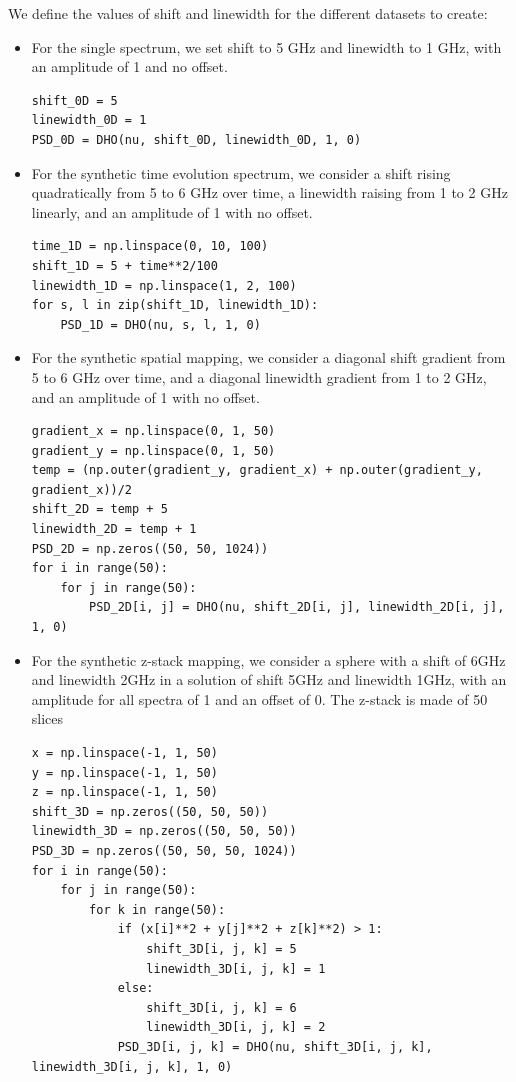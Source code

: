 \documentclass{article}
\begin{document}
We define the values of shift and linewidth for the different datasets to create:
\begin{itemize}
    \item For the single spectrum, we set shift to 5 GHz and linewidth to 1 GHz, with an amplitude of 1 and no offset.
\begin{lstlisting}
shift_0D = 5
linewidth_0D = 1
PSD_0D = DHO(nu, shift_0D, linewidth_0D, 1, 0)
\end{lstlisting}
    \item For the synthetic time evolution spectrum, we consider a shift rising quadratically from 5 to 6 GHz over time, a linewidth raising from 1 to 2 GHz linearly, and an amplitude of 1 with no offset.
\begin{lstlisting}
time_1D = np.linspace(0, 10, 100)
shift_1D = 5 + time**2/100
linewidth_1D = np.linspace(1, 2, 100)
for s, l in zip(shift_1D, linewidth_1D):
    PSD_1D = DHO(nu, s, l, 1, 0)
\end{lstlisting}
    \item For the synthetic spatial mapping, we consider a diagonal shift gradient from 5 to 6 GHz over time, and a diagonal linewidth gradient from 1 to 2 GHz, and an amplitude of 1 with no offset.
\begin{lstlisting}
gradient_x = np.linspace(0, 1, 50)
gradient_y = np.linspace(0, 1, 50)
temp = (np.outer(gradient_y, gradient_x) + np.outer(gradient_y, gradient_x))/2
shift_2D = temp + 5
linewidth_2D = temp + 1 
PSD_2D = np.zeros((50, 50, 1024))
for i in range(50):
    for j in range(50):
        PSD_2D[i, j] = DHO(nu, shift_2D[i, j], linewidth_2D[i, j], 1, 0) 
\end{lstlisting}
    \item For the synthetic z-stack mapping, we consider a sphere with a shift of 6GHz and linewidth 2GHz in a solution of shift 5GHz and linewidth 1GHz, with an amplitude for all spectra of 1 and an offset of 0. The z-stack is made of 50 slices 
\begin{lstlisting}
x = np.linspace(-1, 1, 50)
y = np.linspace(-1, 1, 50)
z = np.linspace(-1, 1, 50)
shift_3D = np.zeros((50, 50, 50))
linewidth_3D = np.zeros((50, 50, 50))
PSD_3D = np.zeros((50, 50, 50, 1024))
for i in range(50):
    for j in range(50):
        for k in range(50):
            if (x[i]**2 + y[j]**2 + z[k]**2) > 1:
                shift_3D[i, j, k] = 5 
                linewidth_3D[i, j, k] = 1 
            else:
                shift_3D[i, j, k] = 6 
                linewidth_3D[i, j, k] = 2 
            PSD_3D[i, j, k] = DHO(nu, shift_3D[i, j, k], linewidth_3D[i, j, k], 1, 0)
\end{lstlisting}
\end{itemize}
\end{document}
